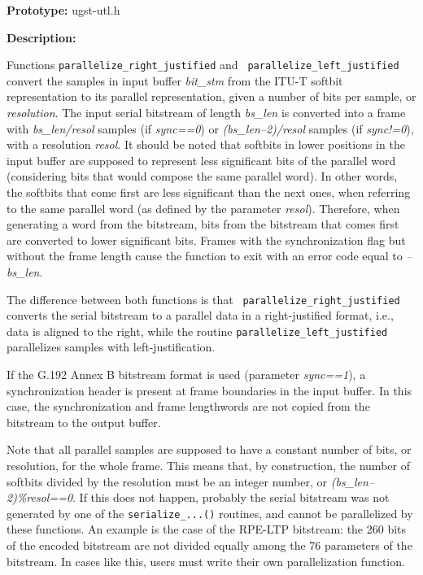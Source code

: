 {\bf Prototype: }    ugst-utl.h

{\bf Description: }

Functions {\tt parallelize\_right\_justified} and {\tt
parallelize\_left\_justified} convert the samples in input buffer {\em
bit\_stm} from the ITU-T softbit representation to its parallel
representation, given a number of bits per sample, or {\em
resolution}.  The input serial bitstream of length {\em bs\_len} is
converted into a frame with {\em bs\_len/resol} samples (if {\em
sync==0}) or {\em (bs\_len--2)/resol} samples (if {\em sync!=0}), with
a resolution {\em resol}. It should be noted that softbits in lower
positions in the input buffer are supposed to represent less
significant bits of the parallel word (considering bits that would
compose the same parallel word). In other words, the softbits that
come first are less significant than the next ones, when referring to
the same parallel word (as defined by the parameter {\em
resol}). Therefore, when generating a word from the bitstream, bits
from the bitstream that comes first are converted to lower significant
bits. Frames with the synchronization flag but without the frame
length cause the function to exit with an error code equal to
{\em --bs\_len}.

The difference between both functions is that {\tt
parallelize\_right\_justified} converts the serial bitstream to a
parallel data in a right-justified format, i.e., data is aligned to
the right, while the routine {\tt parallelize\_left\_justified}
parallelizes samples with left-justification.

If the G.192 Annex B bitstream format is used (parameter {\em
sync==1}), a synchronization header is present at frame boundaries in the
input buffer. In this case, the synchronization and frame lengthwords are not
copied from the bitstream to the output buffer.

Note that all parallel samples are supposed to have a constant number
of bits, or resolution, for the whole frame. This means that, by
construction, the number of softbits divided by the resolution must be
an integer number, or {\em (bs\_len--2)\%resol==0}. If this does not
happen, probably the serial bitstream was not generated by one of the
{\tt serialize\_...()} routines, and cannot be parallelized by these
functions. An example is the case of the RPE-LTP bitstream:
the 260 bits of the encoded bitstream are not divided equally among
the 76 parameters of the bitstream. In cases like this, users must
write their own parallelization function.

